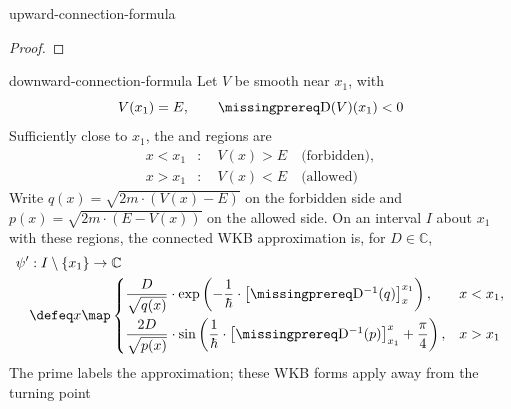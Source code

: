 \documentclass[12pt]{article}
\begin{document}
\begin{thm}{upward-connection-formula}
  \todo
\end{thm}

\begin{proof}
  \todo
\end{proof}

\begin{thm}{downward-connection-formula}
  Let $V$ be smooth near $x_1$, with
  \[
    V(x_1)=E,\qquad \DiffOp(V)(x_1)<0
  \]
  Sufficiently close to $x_1$, the  and  regions are
  \[
    \begin{aligned}
      x<x_1&:\quad V(x)>E\quad\text{(forbidden)},\\
      x>x_1&:\quad V(x)<E\quad\text{(allowed)}
    \end{aligned}
  \]
  Write $q(x)=\sqrt{2m\cdot(V(x)-E)}$ on the forbidden side and $p(x)=\sqrt{2m\cdot(E-V(x))}$ on the allowed side. On an interval $I$ about $x_1$ with these regions, the connected WKB approximation is, for $D\in\mathbb C$,
  \[
    \begin{aligned}
      \psi'&:I\setminus\{x_1\}\to\mathbb C\\
      &\defeq x\map\begin{cases}
        \dfrac{D}{\sqrt{q(x)}}\cdot\exp\left(-\dfrac1\hbar\cdot
          \left[\DiffOp^{-1}(q)\right]_x^{x_1}\right),&x<x_1,\\[1em]
        \dfrac{2D}{\sqrt{p(x)}}\cdot\sin\left(\dfrac1\hbar\cdot
          \left[\DiffOp^{-1}(p)\right]_{x_1}^{x}+\dfrac\pi4\right),&x>x_1
      \end{cases}
    \end{aligned}
  \]
  The prime labels the approximation; these WKB forms apply away from the turning point
\end{thm}
\end{document}
